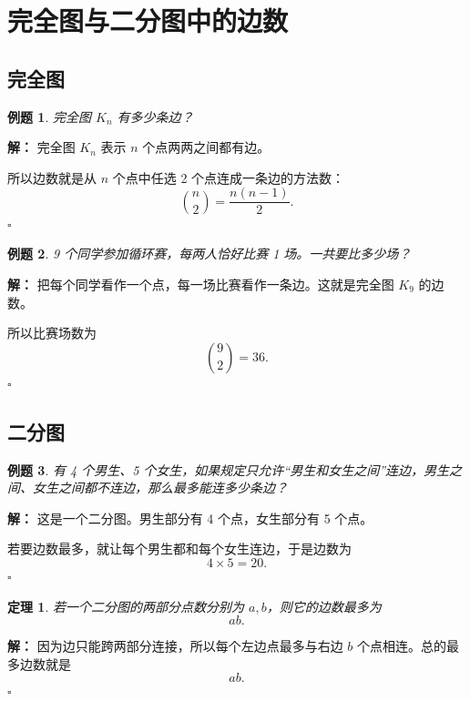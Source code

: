 \documentclass[11pt,a4paper,fontset=fandol]{ctexart}
\theoremstyle{formaltheorem}
\newtheorem{theorem}{定理}[section]
\theoremstyle{formalexample}
\newtheorem{example}{例题}[section]
\newenvironment{solution}{\par\noindent\textbf{解：}}{\hfill$\square$\par}
\begin{document}
\section{完全图与二分图中的边数}

\subsection{完全图}

\begin{example}
完全图 $K_n$ 有多少条边？
\end{example}

\begin{solution}
完全图 $K_n$ 表示 $n$ 个点两两之间都有边。

所以边数就是从 $n$ 个点中任选 2 个点连成一条边的方法数：
\[
\binom{n}{2}=\frac{n(n-1)}{2}.
\]
\end{solution}

\begin{example}
9 个同学参加循环赛，每两人恰好比赛 1 场。一共要比多少场？
\end{example}

\begin{solution}
把每个同学看作一个点，每一场比赛看作一条边。这就是完全图 $K_9$ 的边数。

所以比赛场数为
\[
\binom92=36.
\]
\end{solution}

\subsection{二分图}

\begin{example}
有 4 个男生、5 个女生，如果规定只允许“男生和女生之间”连边，男生之间、女生之间都不连边，那么最多能连多少条边？
\end{example}

\begin{solution}
这是一个二分图。男生部分有 4 个点，女生部分有 5 个点。

若要边数最多，就让每个男生都和每个女生连边，于是边数为
\[
4\times 5=20.
\]
\end{solution}

\begin{theorem}
若一个二分图的两部分点数分别为 $a,b$，则它的边数最多为
\[
ab.
\]
\end{theorem}

\begin{solution}
因为边只能跨两部分连接，所以每个左边点最多与右边 $b$ 个点相连。总的最多边数就是
\[
ab.
\]
\end{solution}
\end{document}
